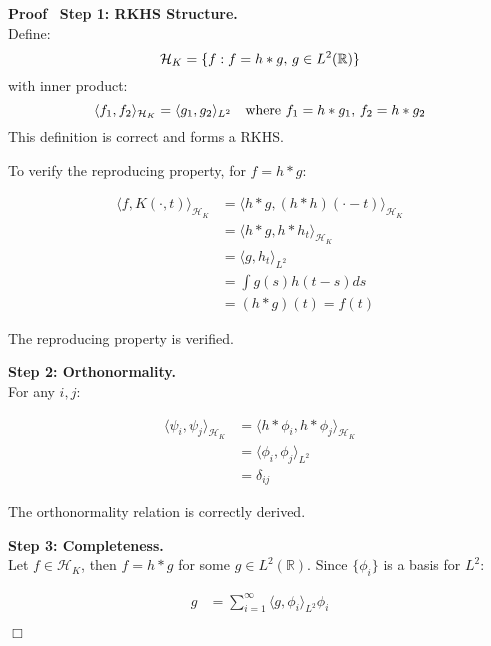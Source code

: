 \documentclass{article}
\newcommand{\tmcolor}[2]{{\color{#1}{#2}}}
\newenvironment{proof}{\noindent\textbf{Proof\ }}{\hspace*{\fill}$\Box$\medskip}
\begin{document}
\begin{proof}
  \textbf{Step 1: RKHS Structure.}\\
  Define:
  \[ \mathcal{H}_K = \{f : f = h \ast g, \hspace{0.17em} g \in L^2
     (\mathbb{R})\} \]
  with inner product:
  \[ \langle f_1, f_2 \rangle_{\mathcal{H}_K} = \langle g_1, g_2 \rangle_{L^2}
     \quad \text{where } f_1 = h \ast g_1, \hspace{0.17em} f_2 = h \ast g_2
  \]
  \tmcolor{green}{{\checkmark}} This definition is correct and forms a RKHS.
  
  To verify the reproducing property, for $f = h \ast g$:
  
  \begin{align}
    \langle f, K (\cdot, t) \rangle_{\mathcal{H}_K} & = \langle h \ast g, (h
    \ast h) (\cdot - t) \rangle_{\mathcal{H}_K} \\
    & = \langle h \ast g, h \ast h_t \rangle_{\mathcal{H}_K} \\
    & = \langle g, h_t \rangle_{L^2} \\
    & = \int g (s) h (t - s) ds \\
    & = (h \ast g) (t) = f (t) 
  \end{align}
  
  \tmcolor{green}{{\checkmark}} The reproducing property is verified.
  
  \textbf{Step 2: Orthonormality.}\\
  For any $i, j$:
  
  \begin{align}
    \langle \psi_i, \psi_j \rangle_{\mathcal{H}_K} & = \langle h \ast \phi_i,
    h \ast \phi_j \rangle_{\mathcal{H}_K} \\
    & = \langle \phi_i, \phi_j \rangle_{L^2} \\
    & = \delta_{ij} 
  \end{align}
  
  \tmcolor{green}{{\checkmark}} The orthonormality relation is correctly
  derived.
  
  \textbf{Step 3: Completeness.}\\
  Let $f \in \mathcal{H}_K$, then $f = h \ast g$ for some $g \in L^2
  (\mathbb{R})$. Since $\{\phi_i \}$ is a basis for $L^2$:
  
  \begin{align}
    g & = \sum_{i = 1}^{\infty} \langle g, \phi_i \rangle_{L^2} \phi_i 
  \end{align}
  

\end{proof}
\end{document}
